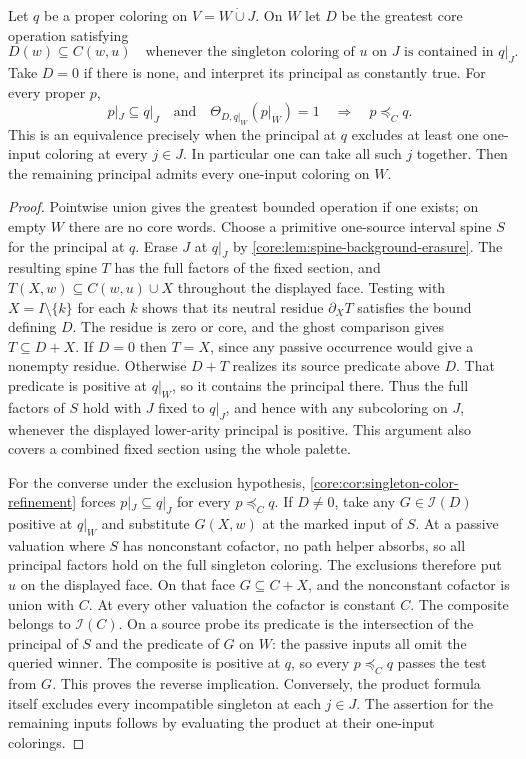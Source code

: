 \begin{theorem}
\label{core:thm:principal-face-factor}
Let $q$ be a proper coloring on $V=W\mathbin{\dot\cup}J$.
On $W$ let $D$ be the greatest core operation satisfying
\[
 D(w)\subseteq C(w,u)
 \quad\text{whenever the singleton coloring of $u$ on $J$ is
 contained in $q|_J$}.
\]
Take $D=0$ if there is none, and interpret its principal as constantly
true. For every proper $p$,
\[
 p|_J\subseteq q|_J\quad\text{and}\quad
 \Theta_{D,q|_W}(p|_W)=1
 \quad\Longrightarrow\quad p\preceq_C q .
\]
This is an equivalence precisely when the principal at $q$ excludes
at least one one-input coloring at every $j\in J$. In particular one
can take all such $j$ together. Then the remaining principal admits
every one-input coloring on $W$.
\end{theorem}
\begin{proof}
Pointwise union gives the greatest bounded operation if one exists;
on empty $W$ there are no core words. Choose a primitive one-source
interval spine $S$ for the principal at $q$. Erase $J$ at $q|_J$
by \cref{core:lem:spine-background-erasure}. The resulting spine
$T$ has the full factors of the fixed section, and
$T(X,w)\subseteq C(w,u)\cup X$ throughout the displayed face.
Testing with $X=I\setminus\{k\}$ for each $k$ shows that its neutral
residue $\partial_XT$ satisfies the bound defining $D$. The residue
is zero or core, and the ghost comparison gives $T\subseteq D+X$.
If $D=0$ then $T=X$, since any passive occurrence would give a
nonempty residue. Otherwise $D+T$ realizes its source predicate above
$D$. That predicate is positive at $q|_W$, so it contains the
principal there. Thus the full factors of $S$ hold with $J$ fixed to
$q|_J$, and hence with any subcoloring on $J$, whenever the displayed
lower-arity principal is positive. This argument also covers a
combined fixed section using the whole palette.

For the converse under the exclusion hypothesis,
\cref{core:cor:singleton-color-refinement} forces
$p|_J\subseteq q|_J$ for every $p\preceq_Cq$.
If $D\ne0$, take any $G\in\mathcal I(D)$ positive at $q|_W$ and
substitute $G(X,w)$ at the marked input of $S$. At a passive valuation
where $S$ has nonconstant cofactor, no path helper absorbs, so all
principal factors hold on the full singleton coloring. The exclusions
therefore put $u$ on the displayed face. On that face $G\subseteq C+X$,
and the nonconstant cofactor is union with $C$. At every other valuation
the cofactor is constant $C$. The composite belongs to $\mathcal I(C)$.
On a source probe its predicate is the intersection of the principal of
$S$ and the predicate of $G$ on $W$: the passive inputs all omit the
queried winner. The composite is positive at $q$, so every $p\preceq_Cq$
passes the test from $G$. This proves the reverse implication.
Conversely, the product formula itself excludes every incompatible
singleton at each $j\in J$. The assertion for the remaining inputs
follows by evaluating the product at their one-input colorings.
\end{proof}

